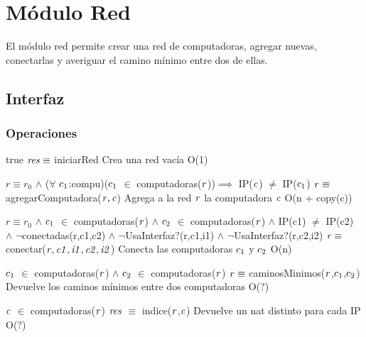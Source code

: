 
\section{Módulo Red}

El módulo red permite crear una red de computadoras, agregar nuevas, conectarlas y averiguar el camino mínimo entre dos de ellas.

\subsection{Interfaz}


\subsubsection*{Operaciones}

 {true}
 {$\text{\textit{res}} \equiv$ iniciarRed}
 {Crea una red vacía}
 {O(1)}

 {$r \equiv r_0$ $\land$ ($\forall$ $\text{\textit{$c_{1}$}}$:compu)($\text{\textit{$c_{1}$}}$ $\in$ computadoras($\text{\textit{r}}$))$\implies$ IP($\text{\textit{c}}$) $\neq$ IP($\text{\textit{$c_{1}$}}$)}
 {$\text{\textit{r}} \equiv$ agregarComputadora($\text{\textit{r}},\text{\textit{c}}$)}
 {Agrega a la red $\text{\textit{r}}$ la computadora $\text{\textit{c}}$}
 {O(n + copy(c))}

 {$r \equiv r_0$ $\land$ $\text{\textit{$c_{1}$}}$ $\in$ computadoras($\text{\textit{r}}$) $\land$ $\text{\textit{$c_{2}$}}$ $\in$ computadoras($\text{\textit{r}}$) $\land$ IP(c1) $\neq$ IP(c2) \\ $\land$ $\neg$conectadas(r,c1,c2) $\land$ $\neg$UsaInterfaz?(r,c1,i1) $\land$ $\neg$UsaInterfaz?(r,c2,i2)}
 {$\text{\textit{r}} \equiv$ conectar($\text{\textit{r}},\text{\textit{c1}},\text{\textit{i1}},\text{\textit{c2}},\text{\textit{i2}}$)}
 {Conecta las computadoras $\text{\textit{$c_{1}$}}$ y $\text{\textit{$c_{2}$}}$}
 {O(n)}

 {$\text{\textit{$c_{1}$}}$ $\in$ computadoras($\text{\textit{r}}$) $\land$ $\text{\textit{$c_{2}$}}$ $\in$ computadoras($\text{\textit{r}}$)}
 {$\text{\textit{r}} \equiv$ caminosMinimos($\text{\textit{r}}$,$\text{\textit{$c_{1}$}}$,$\text{\textit{$c_{2}$}}$)}
 {Devuelve los caminos mínimos entre dos computadoras}
 {O(?)}

 {$\text{\textit{c}}$ $\in$ computadoras($\text{\textit{r}}$)}
 {$\text{\textit{res}}$ $\equiv$ indice($\text{\textit{r}}$,$\text{\textit{c}}$)}
 {Devuelve un nat distinto para cada IP}
 {O(?)}

